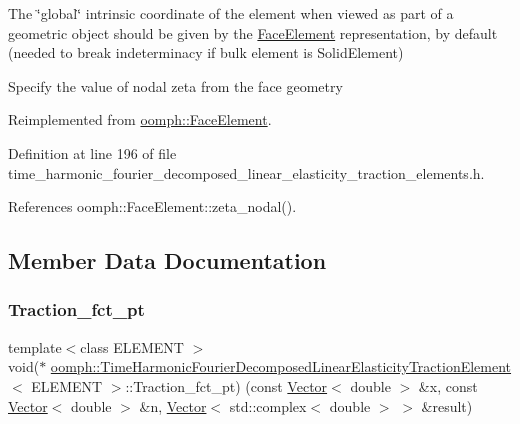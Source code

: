 The \char`\"{}global\char`\"{} intrinsic coordinate of the element when viewed as part of a geometric object should be given by the \hyperlink{classoomph_1_1FaceElement}{Face\+Element} representation, by default (needed to break indeterminacy if bulk element is Solid\+Element) 

Specify the value of nodal zeta from the face geometry 

Reimplemented from \hyperlink{classoomph_1_1FaceElement_a58c9f93705c7741f76c8487d152e68a6}{oomph\+::\+Face\+Element}.



Definition at line 196 of file time\+\_\+harmonic\+\_\+fourier\+\_\+decomposed\+\_\+linear\+\_\+elasticity\+\_\+traction\+\_\+elements.\+h.



References oomph\+::\+Face\+Element\+::zeta\+\_\+nodal().



\subsection{Member Data Documentation}
\mbox{\label{classoomph_1_1TimeHarmonicFourierDecomposedLinearElasticityTractionElement_ab1092987fb0e0180ed97b76d0a1910ac}} 
\subsubsection{\texorpdfstring{Traction\+\_\+fct\+\_\+pt}{Traction\_fct\_pt}}
{\footnotesize\ttfamily template$<$class E\+L\+E\+M\+E\+NT $>$ \\
void($\ast$ \hyperlink{classoomph_1_1TimeHarmonicFourierDecomposedLinearElasticityTractionElement}{oomph\+::\+Time\+Harmonic\+Fourier\+Decomposed\+Linear\+Elasticity\+Traction\+Element}$<$ E\+L\+E\+M\+E\+NT $>$\+::Traction\+\_\+fct\+\_\+pt) (const \hyperlink{classoomph_1_1Vector}{Vector}$<$ double $>$ \&x, const \hyperlink{classoomph_1_1Vector}{Vector}$<$ double $>$ \&n, \hyperlink{classoomph_1_1Vector}{Vector}$<$ std\+::complex$<$ double $>$ $>$ \&result)\hspace{0.3cm}{\ttfamily [protected]}}



